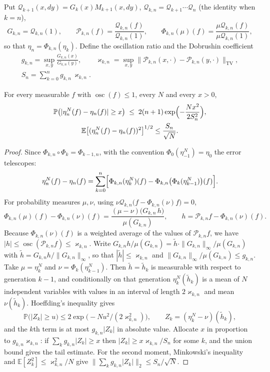 Put $\mathcal Q_{k+1}(x,dy)=G_k(x)M_{k+1}(x,dy)$, $\mathcal Q_{k,n}=\mathcal Q_{k+1}\cdots\mathcal Q_n$ (the identity when $k=n$),
\[
G_{k,n}=\mathcal Q_{k,n}(1),\qquad \mathcal P_{k,n}(f)=\frac{\mathcal Q_{k,n}(f)}{\mathcal Q_{k,n}(1)},\qquad
\Phi_{k,n}(\mu)(f)=\frac{\mu\mathcal Q_{k,n}(f)}{\mu\mathcal Q_{k,n}(1)},
\]
so that $\eta_n=\Phi_{k,n}(\eta_k)$. Define the oscillation ratio and the Dobrushin coefficient
\[
\begin{gathered}
g_{k,n}=\sup_{x,y}\frac{G_{k,n}(x)}{G_{k,n}(y)},\qquad
\varkappa_{k,n}=\sup_{x,y}\bigl\|\mathcal P_{k,n}(x,\cdot)-\mathcal P_{k,n}(y,\cdot)\bigr\|_{\mathrm{TV}},\\
S_n=\sum_{k=0}^n g_{k,n}\,\varkappa_{k,n}.
\end{gathered}
\]

\begin{theorem}[concentration]\label{cf:thm:conc}
For every measurable $f$ with $\operatorname{osc}(f)\le1$, every $N$ and every $x>0$,
\[
\begin{gathered}
\mathbb{P}\bigl(|\eta_n^N(f)-\eta_n(f)|\ge x\bigr)\;\le\;2(n+1)\exp\Bigl(-\frac{Nx^2}{2S_n^2}\Bigr),\\
\mathbb E\bigl[(\eta_n^N(f)-\eta_n(f))^2\bigr]^{1/2}\le\frac{S_n}{\sqrt N}.
\end{gathered}
\]
\end{theorem}

\begin{proof}
Since $\Phi_{k,n}\circ\Phi_k=\Phi_{k-1,n}$, with the convention $\Phi_0(\eta_{-1}^N)=\eta_0$ the error telescopes:
\[
\eta_n^N(f)-\eta_n(f)=\sum_{k=0}^n\Bigl[\Phi_{k,n}(\eta_k^N)(f)-\Phi_{k,n}\bigl(\Phi_k(\eta_{k-1}^N)\bigr)(f)\Bigr].
\]
For probability measures $\mu,\nu$, using $\nu\mathcal Q_{k,n}\bigl(f-\Phi_{k,n}(\nu)f\bigr)=0$,
\[
\Phi_{k,n}(\mu)(f)-\Phi_{k,n}(\nu)(f)=\frac{(\mu-\nu)\bigl(G_{k,n}\,h\bigr)}{\mu(G_{k,n})},\qquad
h=\mathcal P_{k,n}f-\Phi_{k,n}(\nu)(f).
\]
Because $\Phi_{k,n}(\nu)(f)$ is a weighted average of the values of $\mathcal P_{k,n}f$, we have $|h|\le\operatorname{osc}(\mathcal P_{k,n}f)\le\varkappa_{k,n}$. Write $G_{k,n}h/\mu(G_{k,n})=\tilde h\cdot\|G_{k,n}\|_\infty/\mu(G_{k,n})$ with $\tilde h=G_{k,n}h/\|G_{k,n}\|_\infty$, so that $|\tilde h|\le\varkappa_{k,n}$ and $\|G_{k,n}\|_\infty/\mu(G_{k,n})\le g_{k,n}$. Take $\mu=\eta_k^N$ and $\nu=\Phi_k(\eta_{k-1}^N)$. Then $\tilde h=\tilde h_k$ is measurable with respect to generation $k-1$, and conditionally on that generation $\eta_k^N(\tilde h_k)$ is a mean of $N$ independent variables with values in an interval of length $2\varkappa_{k,n}$ and mean $\nu(\tilde h_k)$. Hoeffding's inequality gives
\[
\mathbb{P}\bigl(|Z_k|\ge u\bigr)\le2\exp\bigl(-Nu^2/(2\varkappa_{k,n}^2)\bigr),\qquad
Z_k=(\eta_k^N-\nu)(\tilde h_k),
\]
and the $k$th term is at most $g_{k,n}|Z_k|$ in absolute value. Allocate $x$ in proportion to $g_{k,n}\varkappa_{k,n}$: if $\sum_kg_{k,n}|Z_k|\ge x$ then $|Z_k|\ge x\varkappa_{k,n}/S_n$ for some $k$, and the union bound gives the tail estimate. For the second moment, Minkowski's inequality and $\mathbb E[Z_k^2]\le\varkappa_{k,n}^2/N$ give $\|\sum_kg_{k,n}|Z_k|\|_2\le S_n/\sqrt N$.
\end{proof}

